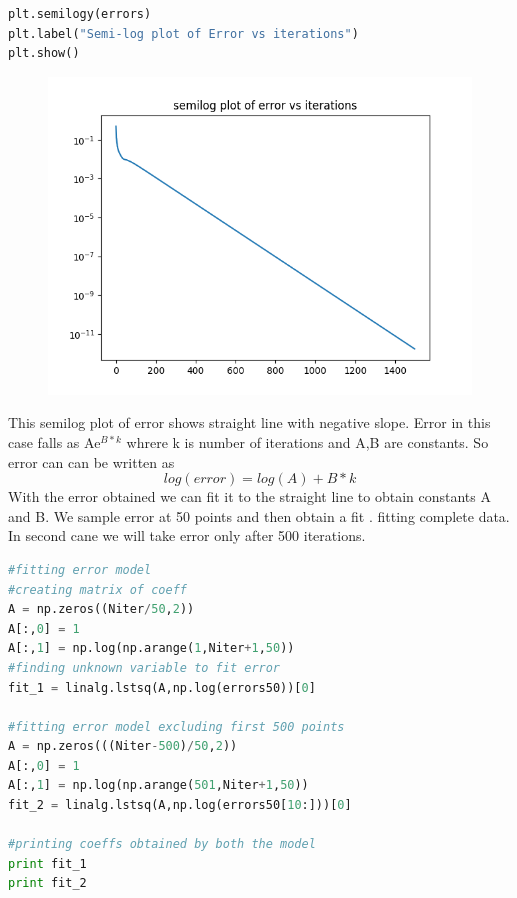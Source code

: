 \documentclass[a4paper]{article}
\begin{document}
\begin{lstlisting}[language=Python]
plt.semilogy(errors)
plt.label("Semi-log plot of Error vs iterations")
plt.show()
\end{lstlisting}
\begin{figure}
\caption{}
\includegraphics{Figure_1-6.png}
\end{figure}
This semilog plot of error shows straight line with negative slope. Error in this case falls as Ae$^{B*k}$ whrere k is number of iterations and A,B are constants. So error can can be written as
$$ log(error) = log(A) + B*k $$
With the error obtained we can fit it to the straight line to obtain constants A and B.
We sample error at 50 points and then obtain a fit . fitting complete data. In second cane we will take error only after 500 iterations.
\begin{lstlisting}[language=Python]
#fitting error model
#creating matrix of coeff 
A = np.zeros((Niter/50,2))
A[:,0] = 1
A[:,1] = np.log(np.arange(1,Niter+1,50))
#finding unknown variable to fit error
fit_1 = linalg.lstsq(A,np.log(errors50))[0]

#fitting error model excluding first 500 points
A = np.zeros(((Niter-500)/50,2))
A[:,0] = 1
A[:,1] = np.log(np.arange(501,Niter+1,50))
fit_2 = linalg.lstsq(A,np.log(errors50[10:]))[0]

#printing coeffs obtained by both the model
print fit_1
print fit_2

\end{lstlisting}
\end{document}
